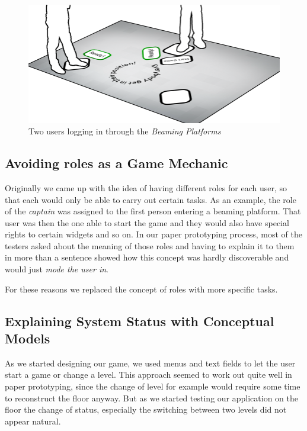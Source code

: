 \documentclass{sigchi}
\begin{document}
\begin{figure}[H]
\centering
\includegraphics[width=0.99\columnwidth]{walkthrough/totale1}
\caption{Two users logging in through the \textit{Beaming Platforms}}
\label{fig:beamingArea}
\end{figure}


\subsection{Avoiding roles as a Game Mechanic}
\vspace{1mm}
Originally we came up with the idea of having different roles for each user, so that each would only be able to carry out certain tasks. As an example, the role of the \textit{captain} was assigned to the first person entering a beaming platform. That user was then the one able to start the game and they would also have special rights to certain widgets and so on. In our paper prototyping process, most of the testers asked about the meaning of those roles and having to explain it to them in more than a sentence showed how this concept was hardly discoverable and would just \textit{mode the user in}.

For these reasons we replaced the concept of roles with more specific tasks.

\subsection{Explaining System Status with Conceptual Models}
\vspace{1mm}
As we started designing our game, we used menus and text fields to let the user start a game or change a level. This approach seemed to work out quite well in paper prototyping, since the change of level for example would require some time to reconstruct the floor anyway. But as we started testing our application on the floor the change of status, especially the switching between two levels did not appear natural. 
\end{document}
